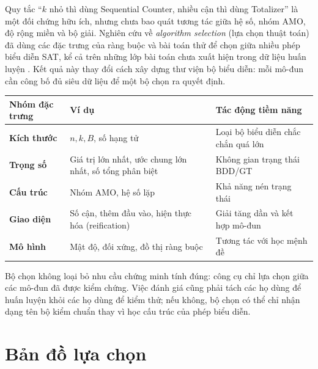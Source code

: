 Quy tắc ``\(k\) nhỏ thì dùng Sequential Counter, nhiều cận thì dùng Totalizer'' là
một đối chứng hữu ích, nhưng chưa bao quát tương tác giữa hệ số, nhóm AMO, độ
rộng miền và bộ giải. Nghiên cứu về \emph{algorithm selection}
(lựa chọn thuật toán) đã dùng các đặc trưng của ràng buộc và bài toán
thử để chọn giữa nhiều phép biểu diễn SAT, kể cả trên những lớp bài toán chưa xuất
hiện trong dữ liệu huấn luyện \parencite{ulrich2022selection}. Kết quả này thay
đổi cách xây dựng thư viện bộ biểu diễn: mỗi mô-đun cần công bố đủ siêu dữ liệu để
một bộ chọn ra quyết định.

\begin{center}
\label{tab:selector-features}
\begin{tabularx}{\textwidth}{@{}>{\bfseries\sffamily}p{}YY@{}}
\toprule
Nhóm đặc trưng & Ví dụ & Tác động tiềm năng\\
\midrule
Kích thước & \(n,k,B\), số hạng tử & Loại bộ biểu diễn chắc chắn quá lớn\\
Trọng số & Giá trị lớn nhất, ước chung lớn nhất, số tổng phân biệt & Không gian trạng thái BDD/GT\\
Cấu trúc & Nhóm AMO, hệ số lặp & Khả năng nén trạng thái\\
Giao diện & Số cận, thêm đầu vào, hiện thực hóa (reification) & Giải tăng dần và kết hợp mô-đun\\
Mô hình & Mật độ, đối xứng, đồ thị ràng buộc & Tương tác với học mệnh đề\\
\bottomrule
\end{tabularx}
\end{center}

Bộ chọn không loại bỏ nhu cầu chứng minh tính đúng: công cụ chỉ lựa chọn giữa các
mô-đun đã được kiểm chứng. Việc đánh giá cũng phải tách các họ dùng để huấn
luyện khỏi các họ dùng để kiểm thử; nếu không, bộ chọn có thể chỉ nhận dạng tên
bộ kiểm chuẩn thay vì học cấu trúc của phép biểu diễn.

\section{Bản đồ lựa chọn}

